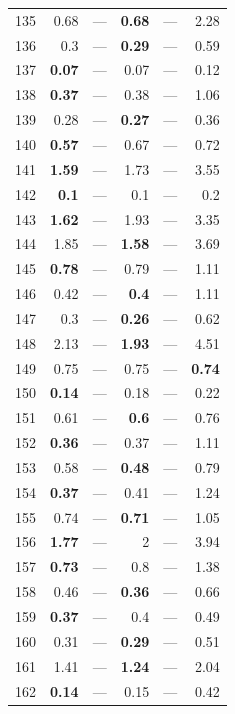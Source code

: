 \begin{longtable}{lr@{\hskip 4pt}l@{\hskip 12pt}r@{\hskip 4pt}l@{\hskip 12pt}r}
135 & 0.68 & --- & \textbf{0.68} & --- & 2.28 \\
136 & 0.3 & --- & \textbf{0.29} & --- & 0.59 \\
137 & \textbf{0.07} & --- & 0.07 & --- & 0.12 \\
138 & \textbf{0.37} & --- & 0.38 & --- & 1.06 \\
139 & 0.28 & --- & \textbf{0.27} & --- & 0.36 \\
140 & \textbf{0.57} & --- & 0.67 & --- & 0.72 \\
141 & \textbf{1.59} & --- & 1.73 & --- & 3.55 \\
142 & \textbf{0.1} & --- & 0.1 & --- & 0.2 \\
143 & \textbf{1.62} & --- & 1.93 & --- & 3.35 \\
144 & 1.85 & --- & \textbf{1.58} & --- & 3.69 \\
145 & \textbf{0.78} & --- & 0.79 & --- & 1.11 \\
146 & 0.42 & --- & \textbf{0.4} & --- & 1.11 \\
147 & 0.3 & --- & \textbf{0.26} & --- & 0.62 \\
148 & 2.13 & --- & \textbf{1.93} & --- & 4.51 \\
149 & 0.75 & --- & 0.75 & --- & \textbf{0.74} \\
150 & \textbf{0.14} & --- & 0.18 & --- & 0.22 \\
151 & 0.61 & --- & \textbf{0.6} & --- & 0.76 \\
152 & \textbf{0.36} & --- & 0.37 & --- & 1.11 \\
153 & 0.58 & --- & \textbf{0.48} & --- & 0.79 \\
154 & \textbf{0.37} & --- & 0.41 & --- & 1.24 \\
155 & 0.74 & --- & \textbf{0.71} & --- & 1.05 \\
156 & \textbf{1.77} & --- & 2 & --- & 3.94 \\
157 & \textbf{0.73} & --- & 0.8 & --- & 1.38 \\
158 & 0.46 & --- & \textbf{0.36} & --- & 0.66 \\
159 & \textbf{0.37} & --- & 0.4 & --- & 0.49 \\
160 & 0.31 & --- & \textbf{0.29} & --- & 0.51 \\
161 & 1.41 & --- & \textbf{1.24} & --- & 2.04 \\
162 & \textbf{0.14} & --- & 0.15 & --- & 0.42 \\
\bottomrule
\end{longtable}